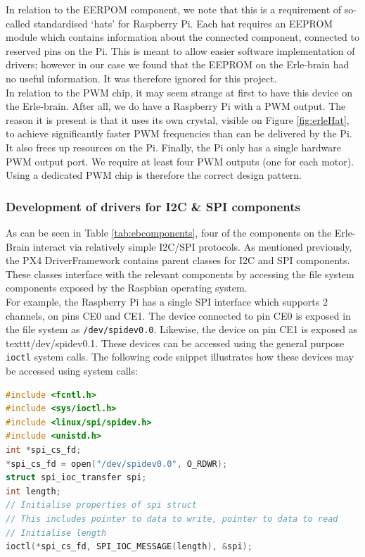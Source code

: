 \documentclass[capstone_report.tex]{subfiles}
\begin{document}
    In relation to the EERPOM component, we note that this is a requirement of so-called standardised `hats' for Raspberry Pi. Each hat requires an EEPROM module which contains information about the connected component, connected to reserved pins on the Pi. This is meant to allow easier software implementation of drivers; however in our case we found that the EEPROM on the Erle-brain had no useful information. It was therefore ignored for this project.\\

    In relation to the PWM chip, it may seem strange at first to have this device on the Erle-brain. After all, we do have a Raspberry Pi with a PWM output. The reason it is present is that it uses its own crystal, visible on Figure \ref{fig:erleHat}, to achieve significantly faster PWM frequencies than can be delivered by the Pi. It also frees up resources on the Pi. Finally, the Pi only has a single hardware PWM output port. We require at least four PWM outputs (one for each motor). Using a dedicated PWM chip is therefore the correct design pattern.

    \subsubsection{Development of drivers for I2C \& SPI components}
    As can be seen in Table \ref{tab:ebcomponents}, four of the components on the Erle-Brain interact via relatively simple I2C/SPI protocols. As mentioned previously, the PX4 DriverFramework contains parent classes for I2C and SPI components. These classes interface with the relevant components by accessing the file system components exposed by the Raspbian operating system. \\

    For example, the Raspberry Pi has a single SPI interface which supports 2 channels, on pins CE0 and CE1. The device connected to pin CE0 is exposed in the file system as \texttt{/dev/spidev0.0}. Likewise, the device on pin CE1 is exposed as texttt{/dev/spidev0.1}. These devices can be accessed using the general purpose \texttt{ioctl} system calls. The following code snippet illustrates how these devices may be accessed using system calls:

\begin{lstlisting}[language=c++]
#include <fcntl.h>
#include <sys/ioctl.h>     
#include <linux/spi/spidev.h>
#include <unistd.h>
int *spi_cs_fd;
*spi_cs_fd = open("/dev/spidev0.0", O_RDWR);
struct spi_ioc_transfer spi;
int length;
// Initialise properties of spi struct
// This includes pointer to data to write, pointer to data to read
// Initialise length
ioctl(*spi_cs_fd, SPI_IOC_MESSAGE(length), &spi);
\end{lstlisting}
\end{document}
